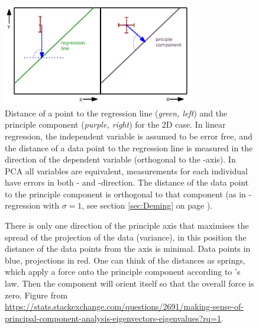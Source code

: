 \begin{refsection}
\begin{figure}
   \caption{Distance of a point to the regression line (\emph{green, left}) and the principle component (\textit{purple, right}) for the 2D case. In linear regression, the independent variable  is assumed to be error free, and the distance of a data point to the regression line is measured in the direction of the dependent variable  (orthogonal to the -axis). In \acs{PCA} all variables are equivalent, measurements for each individual have errors in both - and -direction. The distance of the data point to the principle component is orthogonal to that component (as in -regression with \(\sigma = 1 \), see section \ref{sec:Deming} on page \pageref{sec:Deming}). }
   \label{fig:DirDist}
   \centering
      \includegraphics[width=0.75\textwidth]{Graphics/DirectionOfDistance}
\end{figure}

\begin{figure}
   \caption{There is only one direction of the principle axis that maximises the spread of the projection of the data (variance), in this position the distance of the data points from the axis is minimal. Data points in blue, projections in red.  One can think of the distances as springs, which apply a force onto the principle component according to 's law. Then the component will orient itself so that the overall force is zero. Figure from \href{https://stats.stackexchange.com/questions/2691/making-sense-of-principal-component-analysis-eigenvectors-eigenvalues?rq=1}{https://stats.stackexchange.com/questions/2691/making-sense-of-principal-component-analysis-eigenvectors-eigenvalues?rq=1}. }
   \label{fig:MaxVar}
   \centering
\end{figure}


\end{refsection}
